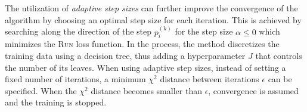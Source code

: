  \label{sec:dsea:dsea:stepsize:adaptive}
The utilization of \emph{adaptive step sizes} \cite{dsea_mirko}
can further improve the convergence of the algorithm
  by choosing an optimal step size for each iteration.
This is achieved by searching
  along the direction of the step $p_i^{(k)}$ %
  for the step size $\alpha \leq 0$
    which minimizes the \textsc{Run} \cite{milke2013} loss function.
In the process,
the method discretizes the training data
  using a decision tree,
  thus adding a hyperparameter $J$
    that controls the number of its leaves.
%
When using adaptive step sizes,
  instead of setting a fixed number of \dsea{} iterations,
a minimum $\chi^2$ distance between iterations $\epsilon$
can be specified.
When the $\chi^2$ distance becomes smaller than $\epsilon$,
convergence is assumed and the training is stopped.

